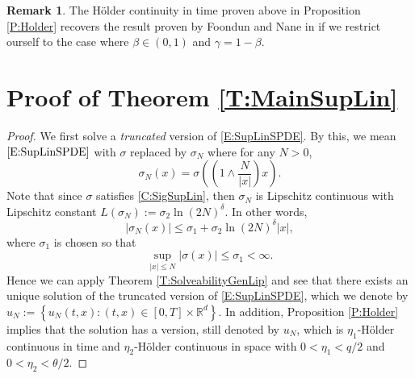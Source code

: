 \documentclass[a4paper,11pt]{article}
\numberwithin{equation}{section}
\theoremstyle{plain}
\theoremstyle{definition}
\newtheorem{remark}[theorem]{Remark}
\newcommand{\R}{\mathbb{R}}
\numberwithin{NQ}{section}
\numberwithin{LQ}{section}
\numberwithin{ZQ}{section}
\begin{document}
	\begin{remark}
		The H\"older continuity in time proven above in Proposition \ref{P:Holder} recovers the result proven by Foondun and Nane in \cite[Theorem 1.9]{foondun.nane:17:asymptotic} if we restrict ourself to the case where $\beta \in (0,1)$ and $\gamma = 1-\beta$.
	\end{remark}


	\section{Proof of Theorem \ref{T:MainSupLin}} \label{S:TMainSupLin}

  \begin{proof}
    We first solve a {\it truncated} version of \eqref{E:SupLinSPDE}. By this, we mean
    $\eqref{E:SupLinSPDE}$ with $\sigma$ replaced by $\sigma_N$ where for any $N >0$,
		\[
			\sigma_N(x) = \sigma\left( \left(1 \wedge \frac{N}{|x|}\right) x \right).
		\]
    Note that since $\sigma$ satisfies \eqref{C:SigSupLin}, then $\sigma_N$ is Lipschitz continuous
    with Lipschitz constant $L(\sigma_N) := \sigma_2 \ln(2N)^{\delta}$. In other words,
		\[
      |\sigma_N(x)| \le \sigma_1 + \sigma_2 \ln(2N)^{\delta}|x|,
		\]
    where $\sigma_1$ is chosen so that
    \[
      \sup_{|x| \le N} |\sigma(x)| \le \sigma_1 < \infty.
    \]
    Hence we can apply Theorem \ref{T:SolveabilityGenLip} and see that there exists an unique
    solution of the truncated version of \eqref{E:SupLinSPDE}, which we denote by $u_N := \left\{
    u_N(t,x) : (t,x) \in [0,T] \times \R^d \right\}$. In addition, Proposition \ref{P:Holder}
    implies that the solution has a version, still denoted by $u_N$, which is $\eta_1$-H\"older
    continuous in time and $\eta_2$-H\"older continuous in space with $0<\eta_1 < q/2$ and $0<\eta_2
    < \theta/2$.


\end{proof}
\end{document}
